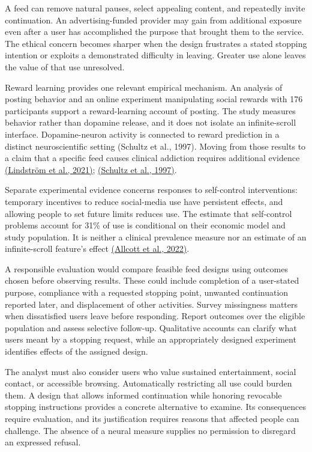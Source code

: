 \noindent \noindent A feed can remove natural pauses, select appealing content,
and repeatedly invite continuation. An advertising-funded provider may
gain from additional exposure even after a user has accomplished the
purpose that brought them to the service. The ethical concern becomes
sharper when the design frustrates a stated stopping intention or
exploits a demonstrated difficulty in leaving. Greater use alone leaves
the value of that use unresolved.

Reward learning provides one relevant empirical mechanism. An analysis
of posting behavior and an online experiment manipulating social rewards
with 176 participants support a reward-learning account of posting. The
study measures behavior rather than dopamine release, and it does not
isolate an infinite-scroll interface. Dopamine-neuron activity is
connected to reward prediction in a distinct neuroscientific setting
(Schultz et al., 1997). Moving from those results to a claim that a
specific feed causes clinical addiction requires additional evidence
\href{https://doi.org/10.1038/s41467-020-19607-x}{(Lindström et al.,
2021)};
\href{https://www.gatsby.ucl.ac.uk/~dayan/papers/sdm97.pdf}{(Schultz et
al., 1997)}.

Separate experimental evidence concerns responses to self-control
interventions: temporary incentives to reduce social-media use have
persistent effects, and allowing people to set future limits reduces
use. The estimate that self-control problems account for 31\% of use is
conditional on their economic model and study population. It is neither
a clinical prevalence measure nor an estimate of an infinite-scroll
feature's effect
\href{https://www.aeaweb.org/articles?id=10.1257/aer.20210867}{(Allcott
et al., 2022)}.

A responsible evaluation would compare feasible feed designs using
outcomes chosen before observing results. These could include completion
of a user-stated purpose, compliance with a requested stopping point,
unwanted continuation reported later, and displacement of other
activities. Survey missingness matters when dissatisfied users leave
before responding. Report outcomes over the eligible population and
assess selective follow-up. Qualitative accounts can clarify what users
meant by a stopping request, while an appropriately designed experiment
identifies effects of the assigned design.

The analyst must also consider users who value sustained entertainment,
social contact, or accessible browsing. Automatically restricting all
use could burden them. A design that allows informed continuation while
honoring revocable stopping instructions provides a concrete alternative
to examine. Its consequences require evaluation, and its justification
requires reasons that affected people can challenge. The absence of a
neural measure supplies no permission to disregard an expressed refusal.


